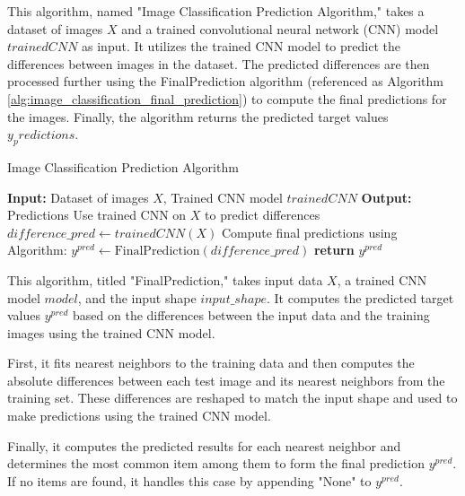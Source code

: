 \documentclass[a4paper, 12pt]{report}
\begin{document}
This algorithm, named "Image Classification Prediction Algorithm," takes a dataset of images $X$ and a trained convolutional neural network 
(CNN) model $trainedCNN$ as input. It utilizes the trained CNN model to predict the differences between images in the dataset. 
The predicted differences are then processed further using the FinalPrediction algorithm (referenced as Algorithm \ref{alg:image_classification_final_prediction}) 
to compute the final predictions for the images. Finally, the algorithm returns the predicted target values $y_predictions$.
\begin{algorithm}
    \caption{Image Classification Prediction Algorithm}
    \label{alg:image_classification_prediction}
    \begin{algorithmic}[1]
            \State \textbf{Input:} Dataset of images $X$, Trained CNN model $trainedCNN$
            \State \textbf{Output:} Predictions 
            \State Use trained CNN on $X$ to predict differences
            \State $difference\_pred \gets trainedCNN(X)$
            \State Compute final predictions using Algorithm: 
            \State $y^{pred} \gets \text{FinalPrediction}(difference\_pred)$ 
            \State \textbf{return} $y^{pred}$
        \EndFunction
    \end{algorithmic}
\end{algorithm}

This algorithm, titled "FinalPrediction," takes input data $X$, a trained CNN model $model$, and the input shape $input\_shape$. 
It computes the predicted target values $y^{pred}$ based on the differences between the input data and the training images using the trained CNN model.

First, it fits nearest neighbors to the training data and then computes the absolute differences between each test image 
and its nearest neighbors from the training set. These differences are reshaped to match the input shape and used to make predictions using the trained CNN model.

Finally, it computes the predicted results for each nearest neighbor and determines the most common item among them to form the 
final prediction $y^{pred}$. If no items are found, it handles this case by appending "None" to $y^{pred}$.
\end{document}
